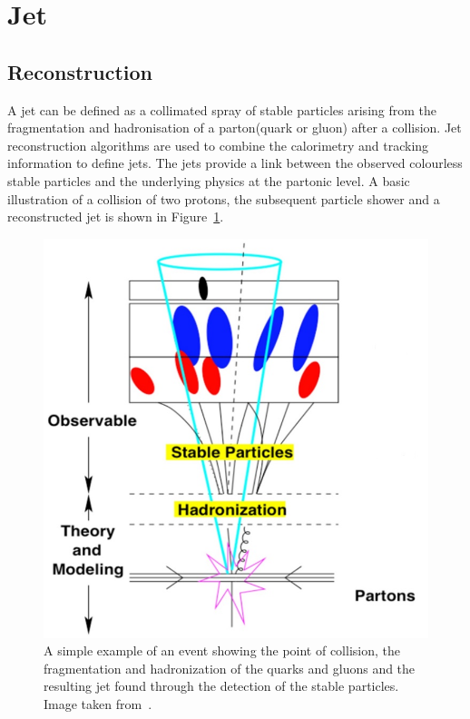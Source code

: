 \section{Jet}
\label{sec:jet} 
\subsection{Reconstruction}
\large
A jet can be defined as a collimated spray 
of stable particles arising from the fragmentation
and hadronisation of a parton(quark or gluon) after a collision.
Jet reconstruction algorithms are used to combine the calorimetry 
and tracking information to define jets. 
The jets provide a link between the observed colourless 
stable particles and the underlying physics at the partonic
level. A basic illustration of a collision of two protons,
the subsequent particle shower and a reconstructed jet is 
shown in Figure~\ref{fig:jets}.

\begin{figure}[bht]
    \begin{centering}	
    \includegraphics[width=.6\textwidth]{Reconstruction_plots/Jets.jpg}
    \caption{A simple example of an event showing the point of collision, 
    the fragmentation and hadronization of the quarks and gluons and the 
    resulting jet found through the detection of the stable particles. 
    Image taken from~\cite{atkin2015review}.
        }
    \label{fig:jets}
    \end{centering}
\end{figure}

